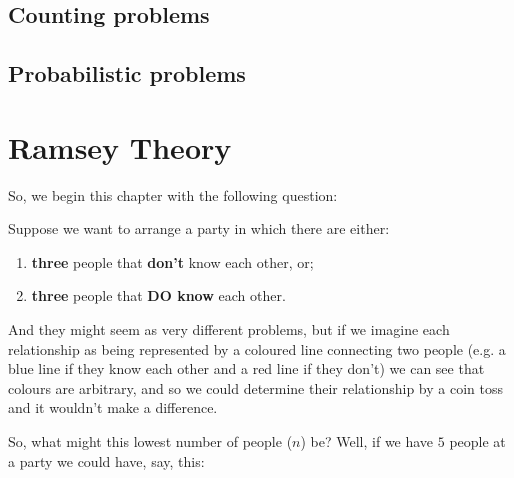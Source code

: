 \documentclass[english, dark, index]{Iart}
\begin{document}
	
	\section{Counting problems}
	
	


	\section{Probabilistic problems}

	\chapter{Ramsey Theory}
	
	So, we begin this chapter with the following question:
	
	Suppose we want to arrange a party in which there are either:
	\begin{enumerate}[label=(\alph*)]
		\item \textbf{three} people that \textbf{don't} know each other, or;
		\item \textbf{three} people that \textbf{DO know }each other.
	\end{enumerate}
	And they might seem as very different problems, but if we imagine each relationship as being represented by a coloured line connecting two people (e.g. a blue line if they know each other and a red line if they don't) we can see that colours are arbitrary, and so we could determine their relationship by a coin toss and it wouldn't make a difference.
	
	So, what might this lowest number of people ($ n $) be? Well, if we have $ 5 $ people at a party we could have, say, this:
	
	\begin{center}
		
		
	\end{center}
\end{document}
